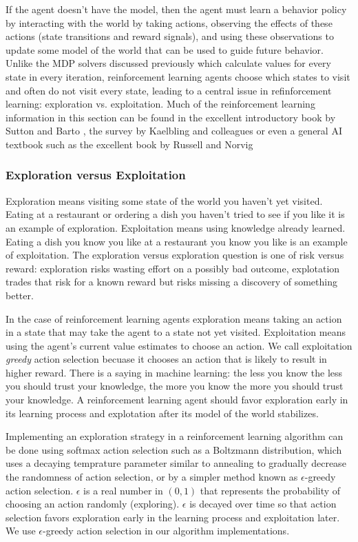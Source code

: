 If the agent doesn't have the model, then the agent must learn a behavior policy by interacting with the world by taking actions, observing the effects of these actions (state transitions and reward signals), and using these observations to update some model of the world that can be used to guide future behavior. Unlike the MDP solvers discussed previously which calculate values for every state in every iteration, reinforcement learning agents choose which states to visit and often do not visit every state, leading to a central issue in refinforcement learning: exploration vs. exploitation. Much of the reinforcement learning information in this section can be found in the excellent introductory book by Sutton and Barto \cite{sutton1998reinforcement}, the survey by Kaelbling and colleagues \cite{kaelbling1996reinforcement} or even a general AI textbook such as the excellent book by Russell and Norvig \cite{russell2003artificial}

\subsubsection{Exploration versus Exploitation}

Exploration means visiting some state of the world you haven't yet visited. Eating at a restaurant or ordering a dish you haven't tried to see if you like it is an example of exploration. Exploitation means using knowledge already learned. Eating a dish you know you like at a restaurant you know you like is an example of exploitation. The exploration versus exploration question is one of risk versus reward: exploration risks wasting effort on a possibly bad outcome, explotation trades that risk for a known reward but risks missing a discovery of something better.

In the case of reinforcement learning agents exploration means taking an action in a state that may take the agent to a state not yet visited. Exploitation means using the agent's current value estimates to choose an action. We call exploitation {\it greedy} action selection becuase it chooses an action that is likely to result in higher reward. There is a saying in machine learning: the less you know the less you should trust your knowledge, the more you know the more you should trust your knowledge. A reinforcement learning agent should favor exploration early in its learning process and explotation after its model of the world stabilizes.

Implementing an exploration strategy in a reinforcement learning algorithm can be done using softmax action selection such as a Boltzmann distribution, which uses a decaying temprature parameter similar to annealing to gradually decrease the randomness of action selection, or by a simpler method known as $\epsilon$-greedy action selection.  $\epsilon$ is a real number in $(0, 1)$ that represents the probability of choosing an action randomly (exploring). $\epsilon$ is decayed over time so that action selection favors exploration early in the learning process and exploitation later. We use $\epsilon$-greedy action selection in our algorithm implementations.


